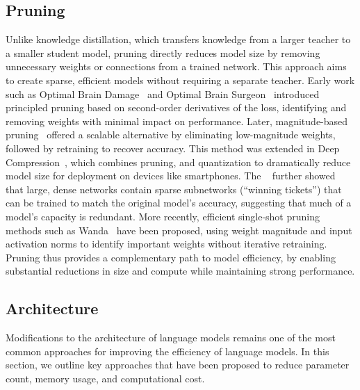 \subsection{Pruning}

Unlike knowledge distillation, which transfers knowledge from a larger teacher to a smaller student model, pruning directly reduces model size by removing unnecessary weights or connections from a trained network. This approach aims to create sparse, efficient models without requiring a separate teacher.
Early work such as Optimal Brain Damage~\citep{lecun1990optimal} and Optimal Brain Surgeon~\citep{hassibi1993optimal} introduced principled pruning based on second-order derivatives of the loss, identifying and removing weights with minimal impact on performance. Later, magnitude-based pruning~\citep{han2015learning} offered a scalable alternative by eliminating low-magnitude weights, followed by retraining to recover accuracy. This method was extended in Deep Compression~\citep{han2016deep}, which combines pruning, and quantization to dramatically reduce model size for deployment on devices like smartphones.
The ~\citep{frankle2019lottery} further showed that large, dense networks contain sparse subnetworks (“winning tickets”) that can be trained to match the original model's accuracy, suggesting that much of a model's capacity is redundant. More recently, efficient single-shot pruning methods such as Wanda~\citep{sun2024simple} have been proposed, using weight magnitude and input activation norms to identify important weights without iterative retraining.
Pruning thus provides a complementary path to model efficiency, by enabling substantial reductions in size and compute while maintaining strong performance.

\subsection{Architecture}

Modifications to the architecture of language models remains one of the most common approaches for improving the efficiency of language models. In this section, we outline key approaches that have been proposed to reduce parameter count, memory usage, and computational cost.

